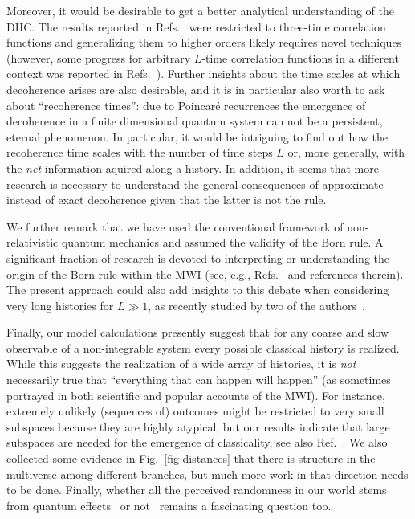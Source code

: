 \documentclass[pre,onecolumn,12pt,aps,longbibliography,nofootinbib]{revtex4-2}
\newcommand{\blue}[1]{#1}
\newcommand{\new}[1]{#1}
\begin{document}
\blue{Moreover,} it would be desirable to get a better analytical understanding of the DHC. The results reported in Refs.~\cite{StrasbergEtAlPRA2023, StrasbergSP2023} were restricted to three-time correlation functions and generalizing them to higher orders likely requires novel techniques (however, some progress for arbitrary $L$-time correlation functions in a different context was reported in Refs.~\cite{FigueroaRomeroModiPollockQuantum2019, FigueroaRomeroPollockModiCP2021, DowlingEtAlQuantum2023, DowlingEtAlSPC2023}). Further insights about the time scales at which \new{decoherence} arises are also desirable, and it is in particular also worth to ask about ``recoherence times'': due to Poincar\'e recurrences the emergence of \new{decoherence} in a finite dimensional quantum system can not be a persistent, eternal phenomenon. In particular, it would be intriguing to find out how the recoherence time scales with the number of time steps $L$ or, more generally, with the \emph{net} information aquired along a history. \blue{In addition, it seems that more research is necessary to understand the general consequences of approximate instead of exact decoherence given that the latter is not the rule.}

We further remark that we have used the conventional framework of non-relativistic quantum mechanics and assumed the validity of the Born rule. A significant fraction of research is devoted to interpreting or understanding the origin of the Born rule within the MWI (see, e.g., Refs.~\cite{VaidmanISPS1998, SaundersEtAlBook2010, AguirreTegmarkPRD2011, WallaceBook2012, Vaidman2020, ZurekEnt2022} \new{and references therein). The present approach could also add insights to this debate when considering very long histories for $L\gg1$, as recently studied by two of the authors~\cite{StrasbergSchindlerArXiv2023}.}

Finally, our model calculations presently suggest that for any coarse and slow observable of a non-integrable system every possible classical history is realized. While this suggests the realization of a wide array of histories, it is \emph{not} necessarily true that ``everything that can happen will happen'' (as sometimes portrayed in both scientific and popular accounts of the MWI). For instance, extremely unlikely (sequences of) outcomes might be restricted to very small subspaces because they are highly atypical, but our results indicate that large subspaces are needed for the emergence of classicality\new{, see also Ref.~\cite{StrasbergSchindlerArXiv2023}}. \blue{We also collected some evidence in Fig.~\ref{fig distances} that there is structure in the multiverse among different branches, but much more work in that direction needs to be done.} Finally, whether all the perceived randomness in our world stems from quantum effects~\cite{AlbrechtPhillipsPRD2014} \new{or not}~\cite{DelSantoGisinPRA2019} \new{remains a fascinating question too}.
\end{document}
